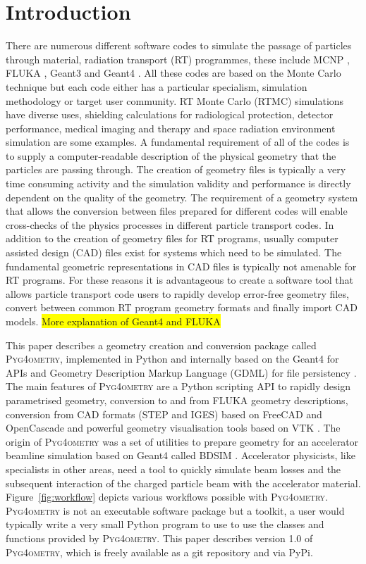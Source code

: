\documentclass[final,5p,times,twocolumn]{elsarticle}
\newcommand{\PYGEOMETRY}{\textsc{Pyg4ometry}}
\begin{document}
\section{Introduction} \label{sec:introduction}
There are numerous different software codes to simulate the passage of particles through material, radiation transport (RT) programmes, these 
include MCNP \cite{Mcnp_Werner}, FLUKA \cite{Fluka_Ferrari,Fluka_Bohlen}, Geant3 \cite{Geant3_Brun} and Geant4 \cite{Geant4_Agostinelli}. 
All these codes are based on the Monte Carlo technique but each code either has a particular specialism, simulation methodology or target user community.  
RT Monte Carlo (RTMC) simulations have diverse uses, shielding calculations for radiological protection, detector performance, medical imaging and therapy and space radiation environment  simulation are some examples. A fundamental requirement of all of the codes is to supply a computer-readable description of the 
physical geometry that  the particles are passing through.  The creation of geometry files is typically a very time consuming activity and the simulation validity 
and performance is directly dependent on the quality of the geometry. The requirement of a geometry system that allows the conversion between files prepared 
for different codes will enable cross-checks of the physics processes in different particle transport codes. In addition to the creation of geometry files for RT 
programs, usually computer assisted design (CAD) files exist for systems which need to be simulated. The fundamental geometric 
representations in CAD files is typically not amenable for RT programs.  For these reasons it is advantageous to create a software tool that allows 
particle transport code users to rapidly develop error-free geometry files, convert between common RT program geometry formats and finally import CAD models. 
\colorbox{yellow}{More explanation of Geant4 and FLUKA} 

This paper describes a geometry creation and conversion package called \PYGEOMETRY{}, implemented in Python and internally based on the Geant4 for APIs and Geometry Description Markup Language (GDML) for file persistency  \cite{GDML}. The main features of \PYGEOMETRY{} are a Python scripting API to rapidly design parametrised geometry, conversion to and from  FLUKA geometry descriptions, conversion from CAD formats  (STEP and IGES) based on FreeCAD \cite{FreeCAD} and OpenCascade \cite{OpenCASCADE} and powerful geometry visualisation tools based on VTK \cite{VTK4}. The origin of \PYGEOMETRY{} was a set of utilities to prepare geometry for an accelerator beamline simulation based on Geant4 called BDSIM \cite{BDSIM_Nevay}. Accelerator physicists, like specialists in other areas, need a tool to quickly simulate beam losses and the subsequent interaction of the charged particle beam with the accelerator material. Figure~\ref{fig:workflow} depicts various workflows possible with \PYGEOMETRY{}. \PYGEOMETRY{} is not an executable software package but a toolkit, a user would typically write a very small Python program to use to use the classes and functions provided by \PYGEOMETRY{}. This paper describes version 1.0 of \PYGEOMETRY{}, which is freely available as a git repository and via PyPi. 
\end{document}
